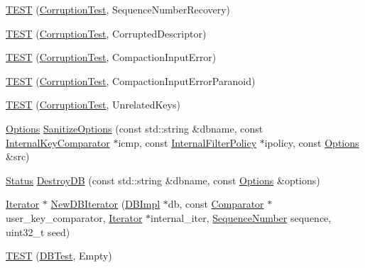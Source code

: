 \begin{DoxyCompactItemize}
\item 
\mbox{\hyperlink{namespaceleveldb_acc1b0ed2e8e9e4e6b930a1727d9fe0f8}{T\+E\+ST}} (\mbox{\hyperlink{classleveldb_1_1_corruption_test}{Corruption\+Test}}, Sequence\+Number\+Recovery)
\item 
\mbox{\hyperlink{namespaceleveldb_ab52c022fc16dd83fe1c1c60745c9557c}{T\+E\+ST}} (\mbox{\hyperlink{classleveldb_1_1_corruption_test}{Corruption\+Test}}, Corrupted\+Descriptor)
\item 
\mbox{\hyperlink{namespaceleveldb_ac45d45675cfba0614b5788177b03e717}{T\+E\+ST}} (\mbox{\hyperlink{classleveldb_1_1_corruption_test}{Corruption\+Test}}, Compaction\+Input\+Error)
\item 
\mbox{\hyperlink{namespaceleveldb_a2bb2a098a32d42044e6be132020b29b0}{T\+E\+ST}} (\mbox{\hyperlink{classleveldb_1_1_corruption_test}{Corruption\+Test}}, Compaction\+Input\+Error\+Paranoid)
\item 
\mbox{\hyperlink{namespaceleveldb_adbafd76c895bbb400c6aa4ad6e0eae2e}{T\+E\+ST}} (\mbox{\hyperlink{classleveldb_1_1_corruption_test}{Corruption\+Test}}, Unrelated\+Keys)
\item 
\mbox{\hyperlink{structleveldb_1_1_options}{Options}} \mbox{\hyperlink{namespaceleveldb_aa4783e598841dca4393a97d360d10f56}{Sanitize\+Options}} (const std\+::string \&dbname, const \mbox{\hyperlink{classleveldb_1_1_internal_key_comparator}{Internal\+Key\+Comparator}} $\ast$icmp, const \mbox{\hyperlink{classleveldb_1_1_internal_filter_policy}{Internal\+Filter\+Policy}} $\ast$ipolicy, const \mbox{\hyperlink{structleveldb_1_1_options}{Options}} \&src)
\item 
\mbox{\hyperlink{classleveldb_1_1_status}{Status}} \mbox{\hyperlink{namespaceleveldb_aa8b29424fdd7d5113876e89682d68e6f}{Destroy\+DB}} (const std\+::string \&dbname, const \mbox{\hyperlink{structleveldb_1_1_options}{Options}} \&options)
\item 
\mbox{\hyperlink{classleveldb_1_1_iterator}{Iterator}} $\ast$ \mbox{\hyperlink{namespaceleveldb_a0d4b256207f27afbf4ad03976fe0fae8}{New\+D\+B\+Iterator}} (\mbox{\hyperlink{classleveldb_1_1_d_b_impl}{D\+B\+Impl}} $\ast$db, const \mbox{\hyperlink{structleveldb_1_1_comparator}{Comparator}} $\ast$user\+\_\+key\+\_\+comparator, \mbox{\hyperlink{classleveldb_1_1_iterator}{Iterator}} $\ast$internal\+\_\+iter, \mbox{\hyperlink{namespaceleveldb_a5481ededd221c36d652c371249f869fa}{Sequence\+Number}} sequence, uint32\+\_\+t seed)
\item 
\mbox{\hyperlink{namespaceleveldb_a5cdb2a977033415260acc09b4b1b7171}{T\+E\+ST}} (\mbox{\hyperlink{classleveldb_1_1_d_b_test}{D\+B\+Test}}, Empty)

\end{DoxyCompactItemize}
